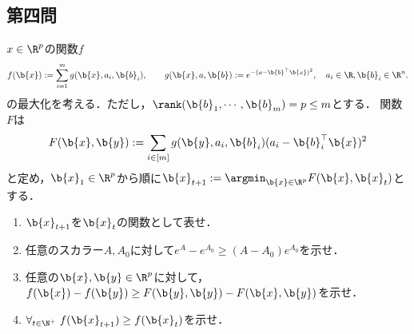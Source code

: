 \documentclass[uplatex,dvipdfmx]{jsarticle}
\begin{document}
\subsection{第四問}

\begin{tcolorbox}[colframe=ForestGreen, colback=ForestGreen!10!white,breakable,colbacktitle=ForestGreen!40!white,coltitle=black,fonttitle=\bfseries\sffamily,
    title=第４問]
    \begin{problem}
        $x\in\R^p$の関数$f$
        \[f(\b{x}):=\sum_{i=1}^mg(\b{x},a_i,\b{b}_i),\qquad g(\b{x},a,\b{b}):=e^{-(a-\b{b}^\top\b{x})^2},\quad a_i\in\R,\b{b}_i\in\R^n.\]
        の最大化を考える．ただし，$\rank(\b{b}_1,\cdots,\b{b}_m)=p\le m$とする．
        関数$F$は
        \[F(\b{x},\b{y}):=\sum_{i\in[m]}g(\b{y},a_i,\b{b}_i)(a_i-\b{b}_i^\top\b{x})^2\]
        と定め，$\b{x}_1\in\R^p$から順に$\b{x}_{t+1}:=\argmin_{\b{x}\in\R^p}F(\b{x},\b{x}_t)$とする．
        \begin{enumerate}[{問}1]
            \item $\b{x}_{t+1}$を$\b{x}_t$の関数として表せ．
            \item 任意のスカラー$A,A_0$に対して$e^{A}-e^{A_0}\ge(A-A_0)e^{A_0}$を示せ．
            \item 任意の$\b{x},\b{y}\in\R^p$に対して，$f(\b{x})-f(\b{y})\ge F(\b{y},\b{y})-F(\b{x},\b{y})$を示せ．
            \item $\forall_{t\in\N^+}\;f(\b{x}_{t+1})\ge f(\b{x}_t)$を示せ．
        \end{enumerate}
    \end{problem}
\end{tcolorbox}
\end{document}
